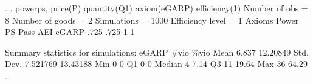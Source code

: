 . 
. powerps, price(P) quantity(Q1) axiom(eGARP) efficiency(1)
{\smallskip}
                       Number of obs           =         8 
                       Number of goods         =         2 
                       Simulations             =      1000 
                       Efficiency level        =         1 
{\smallskip}
      Axioms {\VBAR}     Power         PS       Pass        AEI 
       eGARP {\VBAR}      .725       .725          1          1 
 
Summary statistics for simulations:
{\smallskip}
       eGARP {\VBAR}      \#vio       \%vio 
        Mean {\VBAR}     6.837   12.20849 
   Std. Dev. {\VBAR}  7.521769   13.43188 
         Min {\VBAR}         0          0 
          Q1 {\VBAR}         0          0 
      Median {\VBAR}         4       7.14 
          Q3 {\VBAR}        11      19.64 
         Max {\VBAR}        36      64.29 
{\smallskip}
. 

